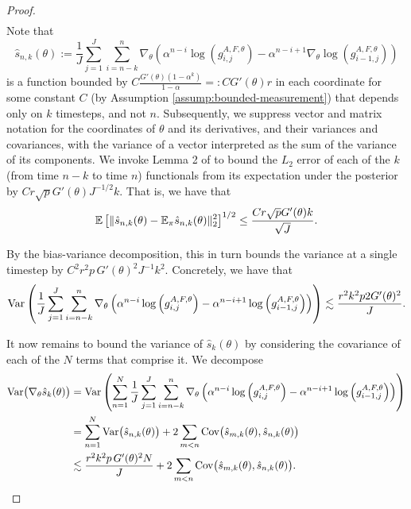 \begin{proof}
\begin{align}
\end{align}
Note that 
\begin{equation}
\hat s_{n,k}(\theta) := \frac{1}{J}\sum_{j=1}^J\sum_{i=n-k}^n \nabla_\theta\left(\alpha^{n-i} \log\left(g_{i,j}^{A,F,\theta}\right)- \alpha^{n-i+1} \nabla_\theta \log\left(g_{i-1,j}^{A,F,\theta}\right)\right)
\end{equation} 
is a function bounded by $C\frac{G'(\theta)(1-\alpha^k)}{1-\alpha} =: CG'(\theta)r$ in each coordinate for some constant $C$ (by Assumption \ref{assump:bounded-measurement}) that depends only on $k$ timesteps, and not $n$. 
Subsequently, we suppress vector and matrix notation for the coordinates of $\theta$ and its derivatives, and their variances and covariances, with the variance of a vector interpreted as the sum of the variance of its components.
We invoke Lemma 2 of \cite{karjalainen23} to bound the $L_2$ error of each of the $k$ (from time $n-k$ to time $n$) functionals from its expectation under the posterior by $Cr\sqrt{p}G'(\theta)J^{-1/2}k$. 
That is, we have that
\begin{equation}\mathbb{E}\left[\|\hat s_{n,k}(\theta) - \mathbb{E}_{\pi}\hat s_{n,k}(\theta)\|_2^2\right]^{1/2} \leq \frac{Cr\sqrt{p}G'(\theta) k}{\sqrt{J}}.\end{equation}


By the bias-variance decomposition, this in turn bounds the variance at a single timestep by $C^2r^2p \, G'(\theta)^2J^{-1}k^2$. Concretely, we have that
\begin{equation}\mathrm{Var}\left(\frac{1}{J}\sum_{j=1}^J\sum_{i=n-k}^n \nabla_\theta\left(\alpha^{n-i} \log\left(g_{i,j}^{A,F,\theta}\right)- \alpha^{n-i+1} \log\left(g_{i-1,j}^{A,F,\theta}\right)\right)\right) \lesssim \frac{r^2k^2p2G'(\theta)^2}{J}.\end{equation}

It now remains to bound the variance of $\hat s_k(\theta)$ by considering the covariance of each of the $N$ terms that comprise it. 
We decompose
\begin{align}
    \mathrm{Var}\big(\nabla_\theta \hat s_k(\theta)\big) &= \mathrm{Var}\left(\sum_{n=1}^N \frac{1}{J}\sum_{j=1}^J\sum_{i=n-k}^n \nabla_\theta\left(\alpha^{n-i} \log\left(g_{i,j}^{A,F,\theta}\right)- \alpha^{n-i+1} \log\left(g_{i-1,j}^{A,F,\theta}\right)\right)\right) \\
    &= \sum_{n=1}^N\mathrm{Var}\big(\hat s_{n,k}(\theta)\big)+ 2\sum_{m<n}\mathrm{Cov}\big(\hat s_{m,k}(\theta), \hat s_{n,k}(\theta)\big) \\
    &\lesssim \frac{r^2k^2p \, G'(\theta)^2N}{J} + 2\sum_{m<n}\mathrm{Cov}\big(\hat s_{m,k}(\theta), \hat s_{n,k}(\theta)\big).
\end{align}


\end{proof}

